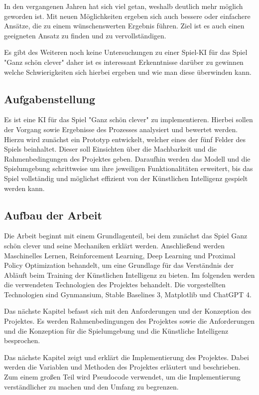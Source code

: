 In den vergangenen Jahren hat sich viel getan, weshalb deutlich mehr möglich geworden ist. Mit neuen Möglichkeiten ergeben sich auch bessere oder einfachere Ansätze, die zu einem wünschenswerten Ergebnis führen. Ziel ist es auch einen geeigneten Ansatz zu finden und zu vervollständigen.

Es gibt des Weiteren noch keine Untersuchungen zu einer Spiel-KI für das Spiel "Ganz schön clever" daher ist es interessant Erkenntnisse darüber zu gewinnen welche Schwierigkeiten sich hierbei ergeben und wie man diese überwinden kann.
\subsection{Aufgabenstellung}
Es ist eine KI für das Spiel "Ganz schön clever" zu implementieren. Hierbei sollen der Vorgang sowie Ergebnisse des Prozesses analysiert und bewertet werden. Hierzu wird zunächst ein Prototyp entwickelt, welcher eines der fünf Felder des Spiels beinhaltet. Dieser soll Einsichten über die Machbarkeit und die Rahmenbedingungen des Projektes geben. Daraufhin werden das Modell und die Spielumgebung schrittweise um ihre jeweiligen Funktionalitäten erweitert, bis das Spiel vollständig und möglichst effizient von der Künstlichen Intelligenz gespielt werden kann.
\subsection{Aufbau der Arbeit}
Die Arbeit beginnt mit einem Grundlagenteil, bei dem zunächst das Spiel Ganz schön clever und seine Mechaniken erklärt werden. Anschließend werden Maschinelles Lernen, Reinforcement Learning, Deep Learning und Proximal Policy Optimization behandelt, um eine Grundlage für das Verständnis der Abläuft beim Training der Künstlichen Intelligenz zu bieten. Im folgenden werden die verwendeten Technologien des Projektes behandelt. Die vorgestellten Technologien sind Gynmansium, Stable Baselines 3, Matplotlib und ChatGPT 4.

Das nächste Kapitel befasst sich mit den Anforderungen und der Konzeption des Projektes. Es werden Rahmenbedingungen des Projektes sowie die Anforderungen und die Konzeption für die Spielumgebung und die Künstliche Intelligenz besprochen.

Das nächste Kapitel zeigt und erklärt die Implementierung des Projektes. Dabei werden die Variablen und Methoden des Projektes erläutert und beschrieben. Zum einem großen Teil wird Pseudocode verwendet, um die Implementierung verständlicher zu machen und den Umfang zu begrenzen.

